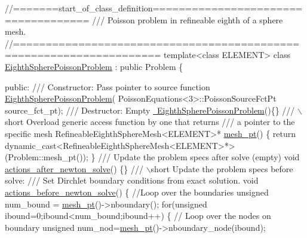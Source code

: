  
\begin{DoxyCodeInclude}
\textcolor{comment}{//=======start\_of\_class\_definition====================================}
\textcolor{comment}{/// Poisson problem in refineable eighth of a sphere mesh.}
\textcolor{comment}{}\textcolor{comment}{//====================================================================}
\textcolor{keyword}{template}<\textcolor{keyword}{class} ELEMENT>
\textcolor{keyword}{class }\hyperlink{classEighthSpherePoissonProblem}{EighthSpherePoissonProblem} : \textcolor{keyword}{public} Problem
\{

\textcolor{keyword}{public}:
\textcolor{comment}{}
\textcolor{comment}{ /// Constructor: Pass pointer to source function}
\textcolor{comment}{} \hyperlink{classEighthSpherePoissonProblem_ae51db2c3e80f0d5628e4d81eb1c11db4}{EighthSpherePoissonProblem}(
  PoissonEquations<3>::PoissonSourceFctPt source\_fct\_pt);
\textcolor{comment}{}
\textcolor{comment}{ /// Destructor: Empty}
\textcolor{comment}{} \hyperlink{classEighthSpherePoissonProblem_a043c7aa08c939fdc019870ad2c2270cc}{~EighthSpherePoissonProblem}()\{\}
\textcolor{comment}{}
\textcolor{comment}{ /// \(\backslash\)short Overload generic access function by one that returns}
\textcolor{comment}{ /// a pointer to the specific  mesh}
\textcolor{comment}{} RefineableEighthSphereMesh<ELEMENT>* \hyperlink{classEighthSpherePoissonProblem_aa33edbb75ba8fe8d4daac3c940a7ff6a}{mesh\_pt}() 
  \{
   \textcolor{keywordflow}{return} \textcolor{keyword}{dynamic\_cast<}RefineableEighthSphereMesh<ELEMENT>*\textcolor{keyword}{>}(Problem::mesh\_pt());
  \}
\textcolor{comment}{}
\textcolor{comment}{ /// Update the problem specs after solve (empty)}
\textcolor{comment}{} \textcolor{keywordtype}{void} \hyperlink{classEighthSpherePoissonProblem_a480189fe5d2f42fe3ff6062d5f151ea3}{actions\_after\_newton\_solve}()  \{\}
\textcolor{comment}{}
\textcolor{comment}{ /// \(\backslash\)short Update the problem specs before solve: }
\textcolor{comment}{ /// Set Dirchlet boundary conditions from exact solution.}
\textcolor{comment}{} \textcolor{keywordtype}{void} \hyperlink{classEighthSpherePoissonProblem_af82dd7abdf631950a68c997af314be5d}{actions\_before\_newton\_solve}()
 \{
  \textcolor{comment}{//Loop over the boundaries}
  \textcolor{keywordtype}{unsigned} num\_bound = \hyperlink{classEighthSpherePoissonProblem_aa33edbb75ba8fe8d4daac3c940a7ff6a}{mesh\_pt}()->nboundary();
  \textcolor{keywordflow}{for}(\textcolor{keywordtype}{unsigned} ibound=0;ibound<num\_bound;ibound++)
   \{
    \textcolor{comment}{// Loop over the nodes on boundary}
    \textcolor{keywordtype}{unsigned} num\_nod=\hyperlink{classEighthSpherePoissonProblem_aa33edbb75ba8fe8d4daac3c940a7ff6a}{mesh\_pt}()->nboundary\_node(ibound);

\end{DoxyCodeInclude}
